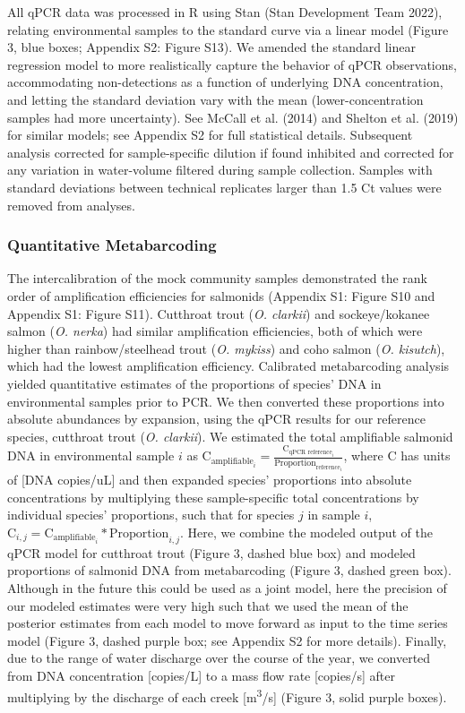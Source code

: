 \documentclass[
]{article}
\begin{document}
All qPCR data was processed in R using Stan (Stan Development Team
2022), relating environmental samples to the standard curve via a linear
model (Figure 3, blue boxes; Appendix S2: Figure S13). We amended the
standard linear regression model to more realistically capture the
behavior of qPCR observations, accommodating non-detections as a
function of underlying DNA concentration, and letting the standard
deviation vary with the mean (lower-concentration samples had more
uncertainty). See McCall et al. (2014) and Shelton et al. (2019) for
similar models; see Appendix S2 for full statistical details. Subsequent
analysis corrected for sample-specific dilution if found inhibited and
corrected for any variation in water-volume filtered during sample
collection. Samples with standard deviations between technical
replicates larger than 1.5 Ct values were removed from analyses.

\hypertarget{quantitative-metabarcoding}{%
\subsubsection{Quantitative
Metabarcoding}\label{quantitative-metabarcoding}}

The intercalibration of the mock community samples demonstrated the rank
order of amplification efficiencies for salmonids (Appendix S1: Figure
S10 and Appendix S1: Figure S11). Cutthroat trout (\emph{O. clarkii})
and sockeye/kokanee salmon (\emph{O. nerka}) had similar amplification
efficiencies, both of which were higher than rainbow/steelhead trout
(\emph{O. mykiss}) and coho salmon (\emph{O. kisutch}), which had the
lowest amplification efficiency. Calibrated metabarcoding analysis
yielded quantitative estimates of the proportions of species' DNA in
environmental samples prior to PCR. We then converted these proportions
into absolute abundances by expansion, using the qPCR results for our
reference species, cutthroat trout (\emph{O. clarkii}). We estimated the
total amplifiable salmonid DNA in environmental sample \(i\) as
\(\text{C}_{\text{amplifiable}_{i}} = \frac{\text{C}_{\text{qPCR reference}_{i}}}{\text{Proportion}_{\text{reference}_{i}}}\),
where C has units of {[}DNA copies/uL{]} and then expanded species'
proportions into absolute concentrations by multiplying these
sample-specific total concentrations by individual species' proportions,
such that for species \(j\) in sample \(i\),
\(\text{C}_{i,j} = \text{C}_{\text{amplifiable}_{i}} * \text{Proportion}_{i,j}\).
Here, we combine the modeled output of the qPCR model for cutthroat
trout (Figure 3, dashed blue box) and modeled proportions of salmonid
DNA from metabarcoding (Figure 3, dashed green box). Although in the
future this could be used as a joint model, here the precision of our
modeled estimates were very high such that we used the mean of the
posterior estimates from each model to move forward as input to the time
series model (Figure 3, dashed purple box; see Appendix S2 for more
details). Finally, due to the range of water discharge over the course
of the year, we converted from DNA concentration {[}copies/L{]} to a
mass flow rate {[}copies/s{]} after multiplying by the discharge of each
creek {[}m\textsuperscript{3}/s{]} (Figure 3, solid purple boxes).
\end{document}
